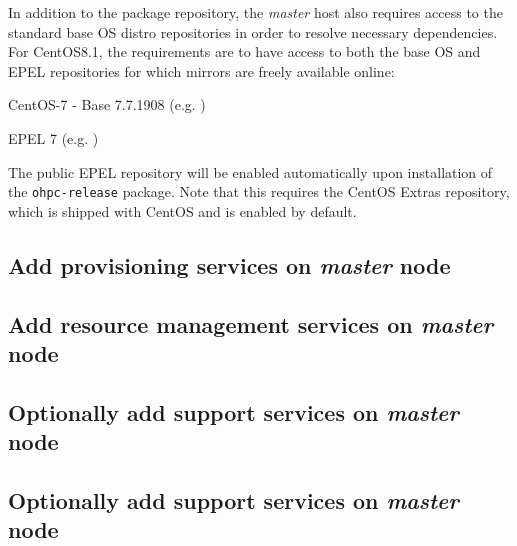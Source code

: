 \documentclass[letterpaper]{article}
\newcommand{\baseOS}{CentOS8.1}
\begin{document}
In addition to the \OHPC{} package repository, the {\em master} host also
requires access to the standard base OS distro repositories in order to resolve
necessary dependencies. For \baseOS{}, the requirements are to have access to
both the base OS and EPEL repositories for which mirrors are freely available online:

\begin{itemize*}
\item CentOS-7 - Base 7.7.1908
  (e.g. \href{http://mirror.centos.org/centos-7/7/os/x86\_64}
             {\color{blue}{http://mirror.centos.org/centos-7/7/os/x86\_64}} )
\item EPEL 7 (e.g. \href{http://download.fedoraproject.org/pub/epel/7/x86\_64}
                        {\color{blue}{http://download.fedoraproject.org/pub/epel/7/x86\_64}} )
\end{itemize*}

\noindent The public EPEL repository will be enabled automatically upon installation of the 
\texttt{ohpc-release} package. Note that this requires the CentOS Extras
repository, which is shipped with CentOS and is enabled by default.




\subsection{Add provisioning services on {\em master} node} \label{sec:add_provisioning}




\subsection{Add resource management services on {\em master} node} \label{sec:add_rm}


\subsection{Optionally add \InfiniBand{} support services on {\em master} node} \label{sec:add_ofed}


\subsection{Optionally add \OmniPath{} support services on {\em master} node} \label{sec:add_opa}

\end{document}
